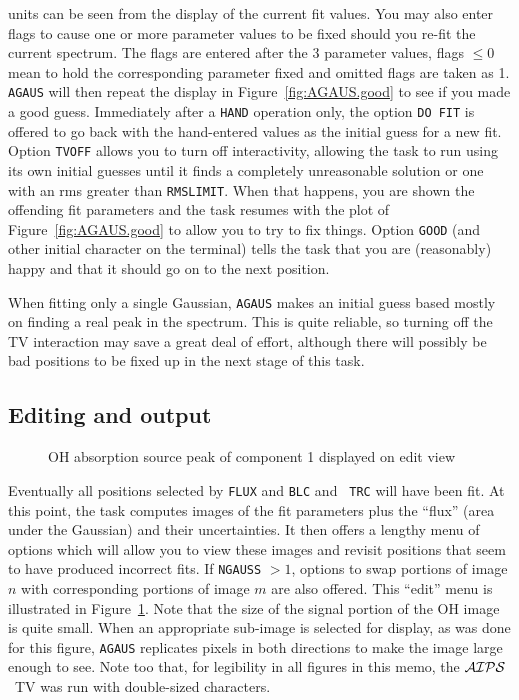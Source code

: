 \documentclass[twoside]{article}
\newcommand{\AIPS}{{$\cal AIPS\/$}}
\newcommand{\putfig}[1]{\texttt{[image: \#1.eps]}}
\begin{document}
units can be seen from the display of the current fit values.  You may
also enter flags to cause one or more parameter values to be fixed
should you re-fit the current spectrum.  The flags are entered after
the 3 parameter values, flags $\leq 0$ mean to hold the corresponding
parameter fixed and omitted flags are taken as 1.  {\tt AGAUS} will
then repeat the display in Figure~\ref{fig:AGAUS.good} to see if you
made a good guess.  Immediately after a {\tt HAND} operation only, the
option {\tt DO FIT} is offered to go back with the hand-entered values
as the initial guess for a new fit.  Option {\tt TVOFF} allows you to
turn off interactivity, allowing the task to run using its own initial
guesses until it finds a completely unreasonable solution or one with
an rms greater than {\tt RMSLIMIT}\@.  When that happens, you are
shown the offending fit parameters and the task resumes with the plot
of Figure~\ref{fig:AGAUS.good} to allow you to try to fix things.
Option {\tt GOOD} (and other initial character on the terminal) tells
the task that you are (reasonably) happy and that it should go on to
the next position.

When fitting only a single Gaussian, {\tt AGAUS} makes an initial
guess based mostly on finding a real peak in the spectrum.  This is
quite reliable, so turning off the TV interaction may save a great
deal of effort, although there will possibly be bad positions to be
fixed up in the next stage of this task.
\vfill\eject

\subsection{Editing and output}

\begin{figure}
\begin{center}
\resizebox{6.0in}{!}{\putfig{AGAUS.edit}}
\caption{OH absorption source peak of component 1 displayed on edit
  view}
\label{fig:AGAUS.edit}
\end{center}
\end{figure}

Eventually all positions selected by {\tt FLUX} and {\tt BLC} and {\tt
  TRC} will have been fit.  At this point, the task computes images of
the fit parameters plus the ``flux'' (area under the Gaussian) and
their uncertainties.  It then offers a lengthy menu of options which
will allow you to view these images and revisit positions that seem to
have produced incorrect fits.  If {\tt NGAUSS} $> 1$, options to swap
portions of image $n$ with corresponding portions of image $m$ are
also offered.  This ``edit'' menu is illustrated in
Figure~\ref{fig:AGAUS.edit}.  Note that the size of the signal portion
of the OH image is quite small.  When an appropriate sub-image is
selected for display, as was done for this figure, {\tt AGAUS}
replicates pixels in both directions to make the image large enough to
see.  Note too that, for legibility in all figures in this memo, the
\AIPS\ TV was run with double-sized characters.
\end{document}
